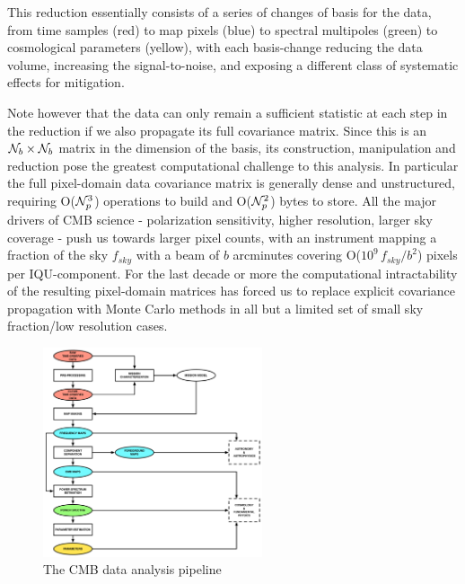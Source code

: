 This reduction essentially consists of a series of changes of basis for the data, from time samples (red) to map pixels (blue) to spectral multipoles (green) to cosmological parameters (yellow), with each basis-change reducing the data volume, increasing the signal-to-noise, and exposing a different class of systematic effects for mitigation.

Note however that the data can only remain a sufficient statistic at each step in the reduction if we also propagate its full covariance matrix. Since this is an ${\cal N}_b \times {\cal N}_b$ matrix in the dimension of the basis, its construction, manipulation and reduction pose the greatest computational challenge to this analysis. In particular the full pixel-domain data covariance matrix is generally dense and unstructured, requiring O(${\cal N}_p^3$) operations to build and O(${\cal N}_p^2$) bytes to store. All the major drivers of CMB science - polarization sensitivity, higher resolution, larger sky coverage - push us towards larger pixel counts, with an instrument mapping a fraction of the sky $f_{sky}$ with a beam of $b$ arcminutes covering O($10^9 \, f_{sky}/b^2$) pixels per IQU-component. For the last decade or more the computational intractability of the resulting pixel-domain matrices has forced us to replace explicit covariance propagation with Monte Carlo methods in all but a limited set of small sky fraction/low resolution cases.

\begin{figure}[htbp]
\centering
\includegraphics[width=0.575\textwidth]{Analysis/da}
\caption{The CMB data analysis pipeline}
\label{fig_da}
\end{figure}

